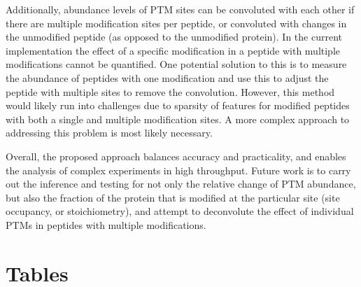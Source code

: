 \documentclass[mcp]{article}
\numberwithin{table}{section}
\begin{document}
Additionally, abundance levels of PTM sites can be convoluted with each other if there are multiple modification sites per peptide, or convoluted with changes in the unmodified peptide (as opposed to the unmodified protein). In the current implementation the effect of a specific modification in a peptide with multiple modifications cannot be quantified. One potential solution to this is to measure the abundance of peptides with one modification and use this to adjust the peptide with multiple sites to remove the convolution. However, this method would likely run into challenges due to sparsity of features for modified peptides with both a single and multiple modification sites. A more complex approach to addressing this problem is most likely necessary.

Overall, the proposed approach balances accuracy and practicality, and enables the analysis of complex experiments in high throughput. Future work is to carry out the inference and testing for not only the relative change of PTM abundance, but also the fraction of the protein that is modified at the particular site (site occupancy, or stoichiometry), and attempt to deconvolute the effect of individual PTMs in peptides with multiple modifications.

\newpage
\printbibliography


\newpage
\section{Tables}
\end{document}
